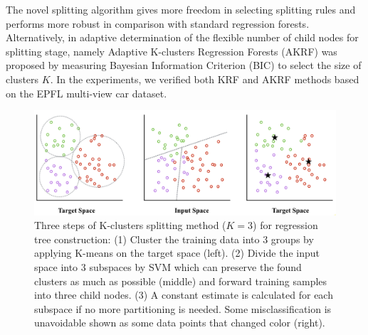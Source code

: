 \documentclass{tutmscthesis}[2010/09/22]
\numberwithin{equation}{section}
\numberwithin{table}{section}
\numberwithin{figure}{section}
\begin{document}
The novel splitting algorithm gives more freedom in selecting splitting rules and performs more robust in comparison with standard regression forests.
 Alternatively, in \cite{hara2014growing} adaptive determination of the flexible number of child nodes for splitting stage, namely Adaptive K-clusters Regression Forests (AKRF) was proposed by measuring Bayesian Information Criterion (BIC) to select the size of clusters $K$. 
In the experiments, we verified both KRF and AKRF methods based on the EPFL multi-view car dataset. 

\begin{figure}[t]
\centering
\includegraphics[width=0.98\linewidth]{K-clusters.png}
\caption{Three steps of K-clusters splitting method ($K=3$) for regression tree construction: (1) Cluster the training data into 3 groups by applying K-means on the target space (left). 
(2) Divide the input space into $3$ subspaces by SVM which can preserve the found clusters as much as possible (middle) and forward training samples into three child nodes. 
(3) A constant estimate is calculated for each subspace if no more partitioning is needed.
Some misclassification is unavoidable shown as some data points that changed color (right).}
\label{Fig:K-clusters Regression Tree} %
\end{figure}
\end{document}
